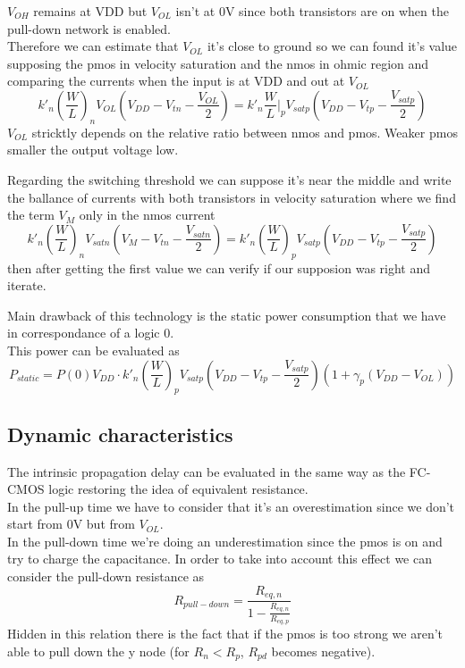 $V_{OH}$ remains at VDD but $V_{OL}$ isn't at 0V since both transistors are on when the pull-down network is enabled.\\
Therefore we can estimate that $V_{OL}$ it's close to ground so we can found it's value supposing the pmos in velocity saturation and the nmos in ohmic region and comparing the currents when the input is at VDD and out at $V_{OL}$
\begin{equation}
k'_n \left(\frac{W}{L}\right)_n   V_{OL}(V_{DD}-V_{tn}-\frac{V_{OL}}{2})=k'_n \frac{W}{L}|_p V_{satp}(V_{DD}-V_{tp}-\frac{V_{satp}}{2})
\end{equation}
$V_{OL}$ stricktly depends on the relative ratio between nmos and pmos. Weaker pmos smaller the output voltage low.\\

\vspace{5mm}

Regarding the switching threshold we can suppose it's near the middle and write the ballance of currents with both transistors in velocity saturation where we find the term $V_M$ only in the nmos current
\begin{equation}
k'_n \left(\frac{W}{L}\right)_n  V_{satn}(V_{M}-V_{tn}-\frac{V_{satn}}{2})=k'_n \left(\frac{W}{L}\right)_p V_{satp}(V_{DD}-V_{tp}-\frac{V_{satp}}{2})
\end{equation}
then after getting the first value we can verify if our supposion was right and iterate.\\

\vspace{5mm}

Main drawback of this technology is the static power consumption that we have in correspondance of a logic 0.\\
This power can be evaluated as 
\begin{equation}
P_{static}=P(0)V_{DD}\cdot k'_n \left(\frac{W}{L}\right)_p V_{satp}(V_{DD}-V_{tp}-\frac{V_{satp}}{2})(1+\gamma_p(V_{DD}-V_{OL}))
\end{equation}

\subsection{Dynamic characteristics}

The intrinsic propagation delay can be evaluated in the same way as the FC-CMOS logic restoring the idea of equivalent resistance.\\
In the pull-up time we have to consider that it's an overestimation since we don't start from 0V but from $V_{OL}$.\\
In the pull-down time we're doing an underestimation since the pmos is on and try to charge the capacitance. In order to take into account this effect we can consider the pull-down resistance as
\begin{equation}
R_{pull-down}=\frac{R_{eq,n}}{1-\frac{R_{eq,n}}{R_{eq,p}}}
\end{equation}
Hidden in this relation there is the fact that if the pmos is too strong we aren't able to pull down the y node (for $R_n<R_p$, $R_{pd}$ becomes negative).\\

